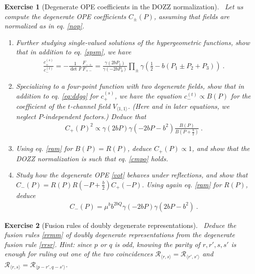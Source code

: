 \documentclass[12pt, a4paper, notitlepage, twoside]{report}
\numberwithin{equation}{section}
\theoremstyle{break}
\newtheorem{exo}{Exercise}[chapter]
\begin{document}
\begin{exo}[Degenerate OPE coefficients in the DOZZ normalization]
 ~\label{exodoc}
 Let us compute the degenerate OPE coefficients $C_\pm(P)$, assuming that fields are normalized as in eq. \eqref{nop}.
\begin{enumerate}
 \item Further studying single-valued solutions of the hypergeometric functions, show that in addition to eq. \eqref{spsm}, we have 
 \begin{align}
  \frac{c_+^{(s)}}{c_-^{(t)}} = -\frac{1}{\det F}\frac{F_{-+}}{F_{+-}} = \frac{\gamma(2bP_1)}{\gamma(-2bP_3)}\prod_\pm \gamma\left(\tfrac12-b(P_1\pm P_2+P_3)\right)\ .
 \end{align}
\item Specializing to a four-point function with two degenerate fields,
show that in addition to eq. \eqref{eq:ddgg} for $c_+^{(s)}$, we have the equation
$
 c_-^{(t)} \propto B(P)
$ for the coefficient of the $t$-channel field $V_{\langle 1,1\rangle}$. 
(Here and in later equations, 
we neglect $P$-independent factors.) Deduce that 
\begin{align}
 C_+(P)^2 \propto \gamma(2bP)\gamma(-2bP-b^2) \frac{B(P)}{B(P+\frac{b}{2})}\ .
\end{align}
\item Using eq. \eqref{ram} for $B(P)=R(P)$, deduce $C_+(P)\propto 1$, and show that the DOZZ normalization is such that eq. \eqref{cmpo} holds. 
\item
Study how the degenerate OPE \eqref{vot} behaves under reflections, and show that $C_-(P) = R(P)R(-P+\frac{b}{2})C_+(-P)$. Using again eq. \eqref{ram} for $R(P)$, deduce
\begin{align}
 C_-(P) = \mu^b b^{2bQ} \gamma(-2bP)\gamma(2bP-b^2)\ .
\end{align}
\end{enumerate}
 \end{exo}


\begin{exo}[Fusion rules of doubly degenerate representations]
 ~\label{exofus}
Deduce the fusion rules \eqref{rrmm} of doubly degenerate representations from the degenerate fusion rule \eqref{rrsr}. 
Hint: since $p$ or $q$ is odd, knowing the parity of $r, r', s, s'$ is enough for ruling out one of the two coincidences $\mathcal{R}_{\langle r,s\rangle} = \mathcal{R}_{\langle r',s'\rangle}$ and $\mathcal{R}_{\langle r,s\rangle} = \mathcal{R}_{\langle p-r',q-s'\rangle}$.
\end{exo}
\end{document}
